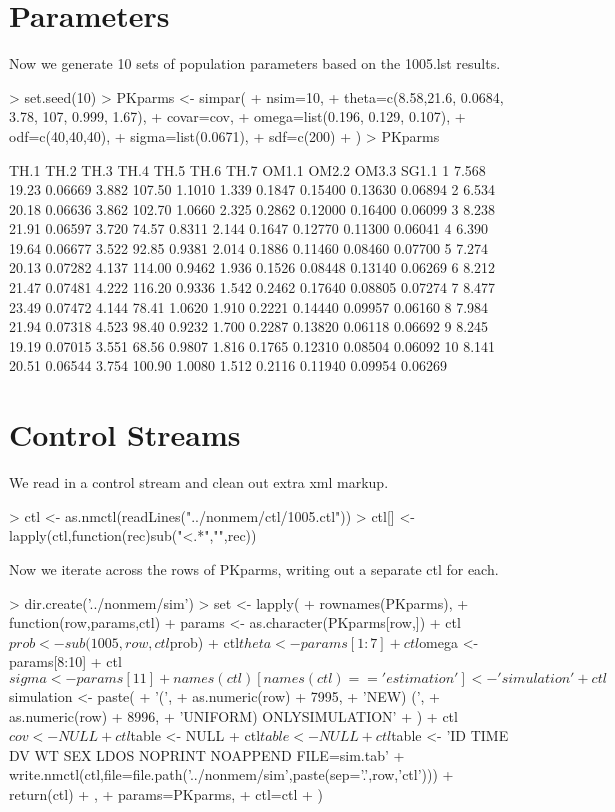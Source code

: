 \section{Parameters}
Now we generate 10 sets of population parameters based on the 1005.lst results.
\begin{Schunk}
\begin{Sinput}
> set.seed(10)
> PKparms <- simpar(
+     nsim=10,
+     theta=c(8.58,21.6, 0.0684, 3.78, 107, 0.999, 1.67),
+     covar=cov,
+     omega=list(0.196, 0.129, 0.107),
+     odf=c(40,40,40),
+     sigma=list(0.0671),
+     sdf=c(200)
+ )
> PKparms
\end{Sinput}
\begin{Soutput}
    TH.1  TH.2    TH.3  TH.4   TH.5   TH.6  TH.7  OM1.1   OM2.2   OM3.3   SG1.1
1  7.568 19.23 0.06669 3.882 107.50 1.1010 1.339 0.1847 0.15400 0.13630 0.06894
2  6.534 20.18 0.06636 3.862 102.70 1.0660 2.325 0.2862 0.12000 0.16400 0.06099
3  8.238 21.91 0.06597 3.720  74.57 0.8311 2.144 0.1647 0.12770 0.11300 0.06041
4  6.390 19.64 0.06677 3.522  92.85 0.9381 2.014 0.1886 0.11460 0.08460 0.07700
5  7.274 20.13 0.07282 4.137 114.00 0.9462 1.936 0.1526 0.08448 0.13140 0.06269
6  8.212 21.47 0.07481 4.222 116.20 0.9336 1.542 0.2462 0.17640 0.08805 0.07274
7  8.477 23.49 0.07472 4.144  78.41 1.0620 1.910 0.2221 0.14440 0.09957 0.06160
8  7.984 21.94 0.07318 4.523  98.40 0.9232 1.700 0.2287 0.13820 0.06118 0.06692
9  8.245 19.19 0.07015 3.551  68.56 0.9807 1.816 0.1765 0.12310 0.08504 0.06092
10 8.141 20.51 0.06544 3.754 100.90 1.0080 1.512 0.2116 0.11940 0.09954 0.06269
\end{Soutput}
\end{Schunk}
\section{Control Streams}
We read in a control stream and clean out extra xml markup.
\begin{Schunk}
\begin{Sinput}
> ctl <- as.nmctl(readLines("../nonmem/ctl/1005.ctl"))
> ctl[] <- lapply(ctl,function(rec)sub("<.*","",rec))
\end{Sinput}
\end{Schunk}
Now we iterate across the rows of PKparms, writing out a separate ctl for each.
\begin{Schunk}
\begin{Sinput}
> dir.create('../nonmem/sim')
> set <- lapply(
+ 	rownames(PKparms),
+ 	function(row,params,ctl){
+ 		params <- as.character(PKparms[row,])
+ 		ctl$prob <- sub(1005,row,ctl$prob)
+ 		ctl$theta <- params[1:7]
+ 		ctl$omega <- params[8:10]
+ 		ctl$sigma <- params[11]
+ 		names(ctl)[names(ctl)=='estimation'] <- 'simulation'
+ 		ctl$simulation <- paste(
+ 			'(',
+ 			as.numeric(row) + 7995,
+ 			'NEW) (',
+ 			as.numeric(row) + 8996,
+ 			'UNIFORM) ONLYSIMULATION'
+ 		)
+ 		ctl$cov <- NULL
+ 		ctl$table <- NULL
+ 		ctl$table <- NULL
+ 		ctl$table <- 'ID TIME DV WT SEX LDOS NOPRINT NOAPPEND FILE=sim.tab'
+ 		write.nmctl(ctl,file=file.path('../nonmem/sim',paste(sep='.',row,'ctl')))
+ 		return(ctl)		
+ 	},
+ 	params=PKparms,
+ 	ctl=ctl
+ )
\end{Sinput}
\end{Schunk}
